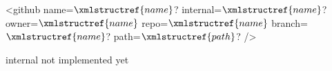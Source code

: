 <github name=$\xmlstructref{name}$? internal=$\xmlstructref{name}$? owner=$\xmlstructref{name}$ repo=$\xmlstructref{name}$
  branch=$\xmlstructref{name}$? path=$\xmlstructref{path}$? />

internal not implemented yet
